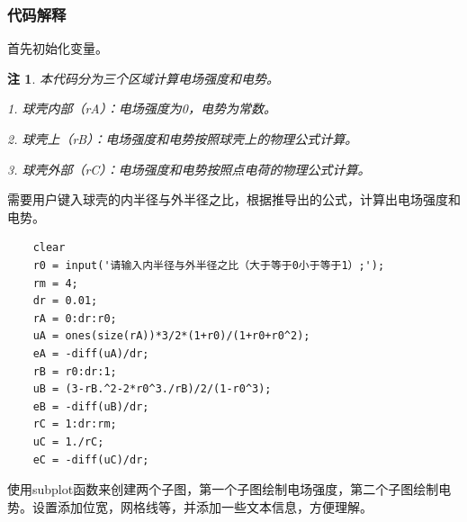 \documentclass[UTF8]{article}
\numberwithin{figure}{subsection}
\numberwithin{table}{subsection}
\newtheorem{remark}{\indent 注}[subsection]
\begin{document}
\begin{multicols}{2}
	\subsubsection{代码解释}
	\par 首先初始化变量。
	\begin{remark}
		\par 本代码分为三个区域计算电场强度和电势。
		\par 1. 球壳内部（rA）：电场强度为0，电势为常数。
		\par 2. 球壳上（rB）：电场强度和电势按照球壳上的物理公式计算。
		\par 3. 球壳外部（rC）：电场强度和电势按照点电荷的物理公式计算。
	\end{remark}
	\par 需要用户键入球壳的内半径与外半径之比，根据推导出的公式，计算出电场强度和电势。
	\begin{lstlisting}
    clear
    r0 = input('请输入内半径与外半径之比（大于等于0小于等于1）;');
    rm = 4;
    dr = 0.01;
    rA = 0:dr:r0;
    uA = ones(size(rA))*3/2*(1+r0)/(1+r0+r0^2);
    eA = -diff(uA)/dr;
    rB = r0:dr:1;
    uB = (3-rB.^2-2*r0^3./rB)/2/(1-r0^3);
    eB = -diff(uB)/dr;
    rC = 1:dr:rm;
    uC = 1./rC;
    eC = -diff(uC)/dr;
	\end{lstlisting}
	\par 使用subplot函数来创建两个子图，第一个子图绘制电场强度，第二个子图绘制电势。设置添加位宽，网格线等，并添加一些文本信息，方便理解。

\end{multicols}
\end{document}
